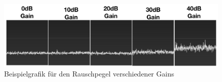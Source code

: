 \begin{figure} [H]
	\centering
	\includegraphics[width=\linewidth]{../ref/noiseflooradjustment.png}
	\caption{Beispielgrafik für den Rauschpegel verschiedener Gains \cite{noauthor_omnidirectional_nodate}}
	\label{fig:noiseflooradjustment}
\end{figure}